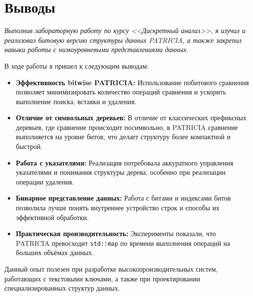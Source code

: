 \section{Выводы}
{\itshape Выполнив лабораторную работу по курсу <<Дискретный анализ>>, я изучил и реализовал 
битовую версию структуры данных PATRICIA, а также закрепил навыки работы с низкоуровневыми 
представлениями данных.}

В ходе работы я пришел к следующим выводам:
\begin{itemize}
    \item \textbf{Эффективность bitwise PATRICIA:} Использование побитового сравнения позволяет 
    минимизировать количество операций сравнения и ускорить выполнение поиска, вставки и удаления.
    
    \item \textbf{Отличие от символьных деревьев:} В отличие от классических префиксных деревьев, 
    где сравнение происходит посимвольно, в PATRICIA сравнение выполняется на уровне битов, 
    что делает структуру более компактной и быстрой.
    
    \item \textbf{Работа с указателями:} Реализация потребовала аккуратного управления указателями 
    и понимания структуры дерева, особенно при реализации операции удаления.
    
    \item \textbf{Бинарное представление данных:} Работа с битами и индексами битов позволила лучше 
    понять внутреннее устройство строк и способы их эффективной обработки.
    
    \item \textbf{Практическая производительность:} Эксперименты показали, что PATRICIA превосходит 
    \texttt{std::map} по времени выполнения операций на больших объёмах данных.
\end{itemize}

Данный опыт полезен при разработке высокопроизводительных систем, работающих с текстовыми ключами, 
а также при проектировании специализированных структур данных.